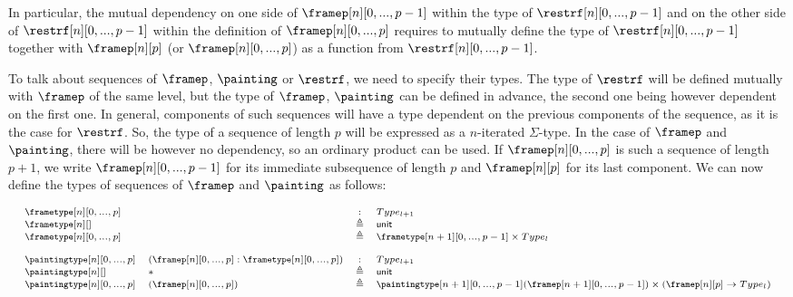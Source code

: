 \documentclass{msc}
\newcommand{\unittype}{\ensuremath{\mathsf{unit}}}
\newcommand{\unitpoint}{\ensuremath{\ast}}
\newcommand{\defeq}{\ensuremath{\triangleq}}
\begin{document}
In particular, the mutual dependency on one side of $\framep[n][0,...,p-1]$ within the type of $\restrf[n][0,...,p-1]$ and on the other side of $\restrf[n][0,...,p-1]$ within the definition of $\framep[n][0,...,p]$ requires to mutually define the type of $\restrf[n][0,...,p-1]$ together with $\framep[n][p]$ (or $\framep[n][0,...,p]$) as a function from $\restrf[n][0,...,p-1]$.

To talk about sequences of $\framep$, $\painting$ or $\restrf$, we need to specify their types. The type of $\restrf$ will be defined mutually with $\framep$ of the same level, but the type of $\framep$, $\painting$ can be defined in advance, the second one being however dependent on the first one. In general, components of such sequences will have a type dependent on the previous components of the sequence, as it is the case for $\restrf$. So, the type of a sequence of length $p$ will be expressed as a $n$-iterated $\Sigma$-type. In the case of $\framep$ and $\painting$, there will be however no dependency, so an ordinary product can be used. If $\framep[n][0,...,p]$ is such a sequence of length $p+1$, we write $\framep[n][0,...,p-1]$ for its immediate subsequence of length $p$ and $\framep[n][p]$ for its last component. We can now define the types of sequences of $\framep$ and $\painting$ as follows:

\begin{equation*}
  \fontsize{7.2}{9}\selectfont
  \begin{array}{llcl}
    \frametype[n][0,...,p]    &                                              & :      & Type_{l+1}                                                                                       \\
    \frametype[n][]           &                                              & \defeq & \unittype                                                                                        \\
    \frametype[n][0,...,p]    &                                              & \defeq & \frametype[n+1][0,...,p-1] \times Type_l                                                         \\
    \\
    \paintingtype[n][0,...,p] & (\framep[n][0,...,p]:\frametype[n][0,...,p]) & :      & Type_{l+1}                                                                                       \\
    \paintingtype[n][]        & \unitpoint                                   & \defeq & \unittype                                                                                        \\
    \paintingtype[n][0,...,p] & (\framep[n][0,...,p])                        & \defeq & \paintingtype[n+1][0,...,p-1](\framep[n+1][0,...,p-1]) \times (\framep[n][p] \rightarrow Type_l) \\
  \end{array}
\end{equation*}
\end{document}
